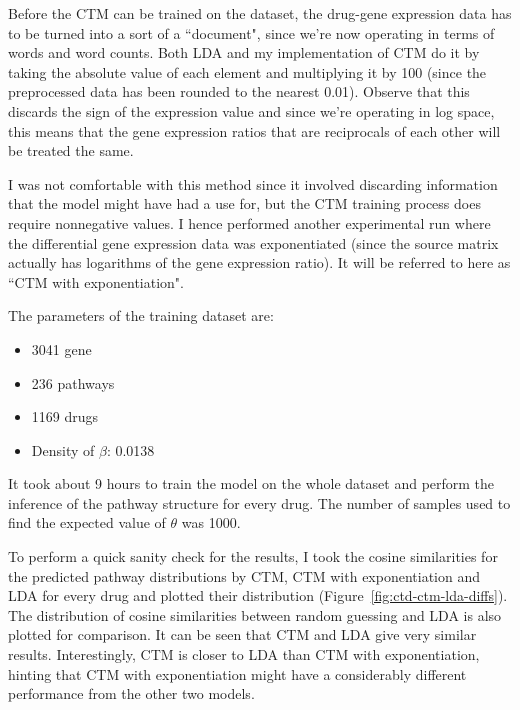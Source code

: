 \documentclass[12pt,a4paper,twoside,openright]{report}
\begin{document}
Before the CTM can be trained on the dataset, the drug-gene expression data has to be turned into a sort of a ``document", since we're now operating in terms of words and word counts. Both LDA and my implementation of CTM do it by taking the absolute value of each element and multiplying it by 100 (since the preprocessed data has been rounded to the nearest 0.01). Observe that this discards the sign of the expression value and since we're operating in log space, this means that the gene expression ratios that are reciprocals of each other will be treated the same.

I was not comfortable with this method since it involved discarding information that the model might have had a use for, but the CTM training process does require nonnegative values. I hence performed another experimental run where the differential gene expression data was exponentiated (since the source matrix actually has logarithms of the gene expression ratio). It will be referred to here as ``CTM with exponentiation".

The parameters of the training dataset are:
\begin{itemize}[noitemsep]
\item 3041 gene
\item 236 pathways
\item 1169 drugs
\item Density of $\beta$: 0.0138
\end{itemize}

It took about 9 hours to train the model on the whole dataset and perform the inference of the pathway structure for every drug. The number of samples used to find the expected value of $\theta$ was 1000.

To perform a quick sanity check for the results, I took the cosine similarities for the predicted pathway distributions by CTM, CTM with exponentiation and LDA for every drug and plotted their distribution (Figure~\ref{fig:ctd-ctm-lda-diffs}). The distribution of cosine similarities between random guessing and LDA is also plotted for comparison. It can be seen that CTM and LDA give very similar results. Interestingly, CTM is closer to LDA than CTM with exponentiation, hinting that CTM with exponentiation might have a considerably different performance from the other two models.
\end{document}
